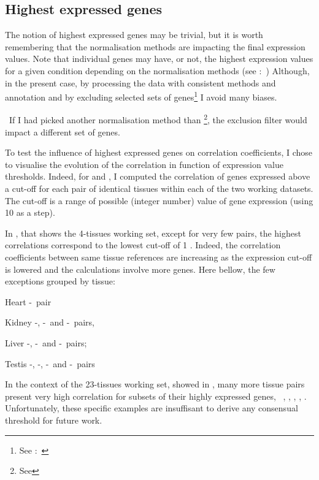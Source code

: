 \subsection{Highest expressed genes}

The notion of highest expressed genes may be trivial,
but it is worth remembering that the normalisation methods are impacting
the final expression values.
Note that individual genes may have, or not,
the highest expression values for a given condition
depending on the normalisation methods
(see :~)
Although, in the present case,
by processing the data with consistent methods and annotation
and by excluding selected sets of
genes\footnote{See :~}
I avoid many biases.

\NB\ If I had picked another normalisation method than \FPKM\footnote{See
},
the exclusion filter would impact a different set of genes.

To test the influence of highest expressed genes on correlation coefficients,
I chose to visualise the evolution of the correlation
in function of expression value thresholds.
Indeed, for  and ,
I computed the correlation of genes expressed above a cut-off
for each pair of identical tissues within each of the two working datasets.
The cut-off is a range of possible (integer number) value of gene expression
(using 10 as a step).

In , that shows the 4-tissues working set,
except for very few pairs, the highest correlations correspond to
the lowest cut-off of 1 \FPKM\@.
Indeed, the correlation coefficients between same tissue references
are increasing as the expression cut-off is lowered
and the calculations involve more genes.
Here bellow, the few exceptions grouped by tissue:
\begin{eqlist}
\item[Heart] \uhlen{}-\gtex\ pair
\item[Kidney] \uhlen{}-\gtex, \castle{}-\uhlen\ and \castle{}-\gtex\ pairs,
\item[Liver]  \vt{}-\ibm, \ibm{}-\uhlen\ and \ibm{}-\uhlen\ pairs;
\item[Testis] \ibm{}-\uhlen, \vt{}-\gtex, \vt{}-\uhlen\ and \uhlen{}-\gtex\ pairs
\end{eqlist}

In the context of the 23-tissues working set,
showed in ,
many more tissue pairs present very high correlation for subsets of their highly
expressed genes, \ie\ \skeletal, \Thyroid, \Cortex, \Uterus, \Kidney.
Unfortunately, these specific examples are insuffisant
to derive any consensual threshold for future work.

